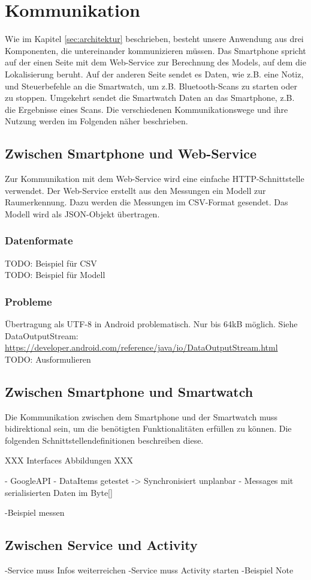 \section{Kommunikation}
Wie im Kapitel \ref{sec:architektur} beschrieben, besteht unsere Anwendung aus drei Komponenten, die untereinander kommunizieren müssen. Das Smartphone spricht auf der einen Seite mit dem Web-Service zur Berechnung des Models, auf dem die Lokalisierung beruht. Auf der anderen Seite sendet es Daten, wie z.B. eine Notiz, und Steuerbefehle an die Smartwatch, um z.B. Bluetooth-Scans zu starten oder zu stoppen. Umgekehrt sendet die Smartwatch Daten an das Smartphone, z.B. die Ergebnisse eines Scans. Die verschiedenen Kommunikationswege und ihre Nutzung werden im Folgenden näher beschrieben.

\subsection{Zwischen Smartphone und Web-Service}

Zur Kommunikation mit dem Web-Service wird eine einfache HTTP-Schnittstelle verwendet.
Der Web-Service erstellt aus den Messungen ein Modell zur Raumerkennung. Dazu
werden die Messungen im CSV-Format gesendet. Das Modell wird als JSON-Objekt
übertragen.

\subsubsection{Datenformate}
TODO: Beispiel für CSV \\
TODO: Beispiel für Modell


\subsubsection{Probleme}
Übertragung als UTF-8 in Android problematisch.
Nur bis 64kB möglich.
Siehe DataOutputStream: \url{https://developer.android.com/reference/java/io/DataOutputStream.html}
TODO: Ausformulieren


\subsection{Zwischen Smartphone und Smartwatch}
Die Kommunikation zwischen dem Smartphone und der Smartwatch muss bidirektional sein, um die benötigten Funktionalitäten erfüllen zu können. Die folgenden Schnittstellendefinitionen beschreiben diese.

XXX Interfaces Abbildungen XXX


- GoogleAPI
	- DataItems getestet -> Synchronisiert  unplanbar
	- Messages mit serialisierten Daten im Byte[]

-Beispiel messen

\subsection{Zwischen Service und Activity}
-Service muss Infos weiterreichen
-Service muss Activity starten
-Beispiel Note


